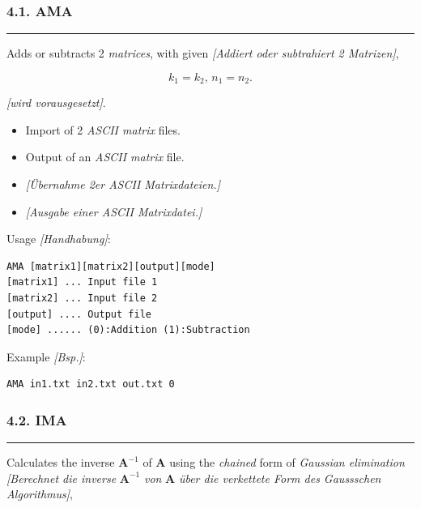 \documentclass[
]{article}
\begin{document}
\hypertarget{ama}{%
\subsubsection{4.1. AMA}\label{ama}}

\begin{center}\rule{0.5\linewidth}{0.5pt}\end{center}

Adds or subtracts 2 \emph{matrices}, with given \emph{{[}Addiert oder
subtrahiert 2 Matrizen{]}},

\[k_{1} = k_{2}\text{,\ }n_{1} = n_{2}.\]

\emph{{[}wird vorausgesetzt{]}}.

\begin{itemize}
\item
  Import of 2 \emph{ASCII matrix} files.
\item
  Output of an \emph{ASCII matrix} file.
\item
  \emph{{[}Übernahme 2er ASCII Matrixdateien.{]}}
\item
  \emph{{[}Ausgabe einer ASCII Matrixdatei.{]}}
\end{itemize}

Usage \emph{{[}Handhabung{]}}:

\begin{verbatim}
AMA [matrix1][matrix2][output][mode] 
[matrix1] ... Input file 1 
[matrix2] ... Input file 2 
[output] .... Output file 
[mode] ...... (0):Addition (1):Subtraction
\end{verbatim}

Example \emph{{[}Bsp.{]}}:

\begin{verbatim}
AMA in1.txt in2.txt out.txt 0
\end{verbatim}

\hypertarget{ima}{%
\subsubsection{4.2. IMA}\label{ima}}

\begin{center}\rule{0.5\linewidth}{0.5pt}\end{center}

Calculates the inverse \(\mathbf{A}^{- 1}\) of \(\mathbf{A}\) using the
\emph{chained} form of \emph{Gaussian elimination {[}Berechnet die
inverse} \(\mathbf{A}^{- 1}\) \emph{von} \(\mathbf{A}\) \emph{über die
verkettete Form des Gaussschen Algorithmus{]}},
\end{document}
